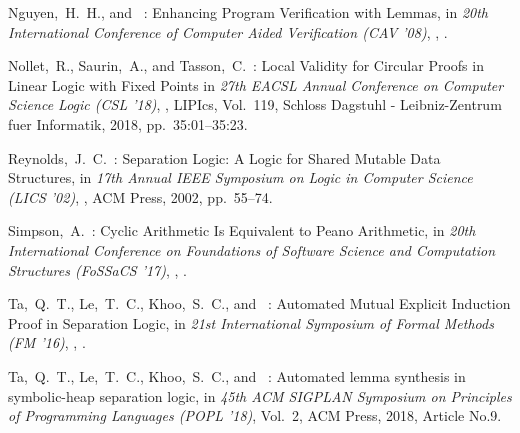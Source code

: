 \begin{thebibliography}{99}



  Nguyen,~H.~H., and \chin~: 
  Enhancing Program Verification with Lemmas,
  in {\it 20th International Conference of Computer Aided Verification (CAV '08)},
  ,
  .
  
  Nollet,~R., Saurin,~A., and Tasson,~C.~: 
  Local Validity for Circular Proofs in Linear Logic with Fixed Points
  in {\it 27th EACSL Annual Conference on Computer Science Logic (CSL '18)},
  ,
  LIPIcs,
  Vol.~119,
  Schloss Dagstuhl - Leibniz-Zentrum fuer Informatik,
  2018,
  pp.~35:01--35:23.

  Reynolds,~J.~C.~: 
  Separation Logic: A Logic for Shared Mutable Data Structures,
  in {\it 17th Annual IEEE Symposium on Logic in Computer Science (LICS '02)},
  ,
  ACM Press,
  2002,
  pp.~55--74.

  
  Simpson,~A.~: 
  Cyclic Arithmetic Is Equivalent to Peano Arithmetic,
  in {\it 20th International Conference on Foundations of Software Science and Computation Structures (FoSSaCS '17)},
  ,
  . 

  Ta,~Q.~T., Le,~T.~C., Khoo,~S.~C., and \chin~: 
  Automated Mutual Explicit Induction Proof in Separation Logic,
  in {\it 21st International Symposium of Formal Methods (FM '16)},
  ,
  . 
  
  Ta,~Q.~T., Le,~T.~C., Khoo,~S.~C., and \chin~: 
  Automated lemma synthesis in symbolic-heap separation logic,
  in {\it 45th ACM SIGPLAN Symposium on Principles of Programming Languages (POPL '18)},
  Vol.~2, 
  ACM Press,
  2018,
  Article No.9.


\end{thebibliography}
